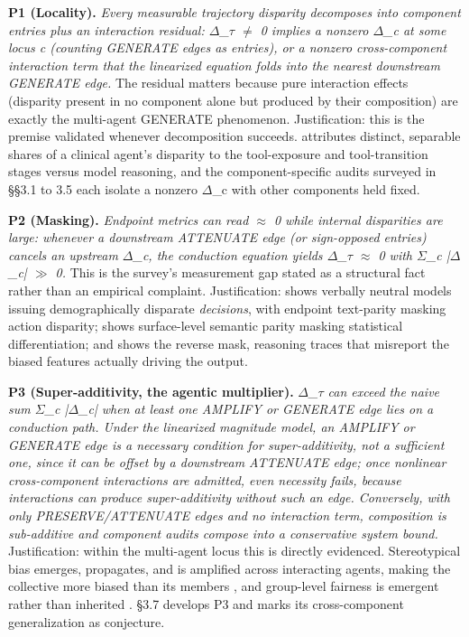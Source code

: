 \documentclass[10pt]{article}
\begin{document}
\textbf{P1 (Locality).} \emph{Every measurable trajectory disparity decomposes into component entries plus an interaction residual: $\Delta$\_$\tau$ $\neq$ 0 implies a nonzero $\Delta$\_c at some locus c (counting GENERATE edges as entries), or a nonzero cross-component interaction term that the linearized equation folds into the nearest downstream GENERATE edge.} The residual matters because pure interaction effects (disparity present in no component alone but produced by their composition) are exactly the multi-agent GENERATE phenomenon. Justification: this is the premise validated whenever decomposition succeeds. \cite{xu2026ducx} attributes distinct, separable shares of a clinical agent's disparity to the tool-exposure and tool-transition stages versus model reasoning, and the component-specific audits surveyed in \S{}\S{}3.1 to 3.5 each isolate a nonzero $\Delta$\_c with other components held fixed.

\textbf{P2 (Masking).} \emph{Endpoint metrics can read $\approx$ 0 while internal disparities are large: whenever a downstream ATTENUATE edge (or sign-opposed entries) cancels an upstream $\Delta$\_c, the conduction equation yields $\Delta$\_$\tau$ $\approx$ 0 with $\Sigma$\_c |$\Delta$\_c| $\gg$ 0.} This is the survey's measurement gap stated as a structural fact rather than an empirical complaint. Justification: \cite{li2025actions} shows verbally neutral models issuing demographically disparate \emph{decisions}, with endpoint text-parity masking action disparity; \cite{xu2025quantifying} shows surface-level semantic parity masking statistical differentiation; and \cite{turpin2023language} shows the reverse mask, reasoning traces that misreport the biased features actually driving the output.

\textbf{P3 (Super-additivity, the agentic multiplier).} \emph{$\Delta$\_$\tau$ can exceed the naive sum $\Sigma$\_c |$\Delta$\_c| when at least one AMPLIFY or GENERATE edge lies on a conduction path. Under the linearized magnitude model, an AMPLIFY or GENERATE edge is a necessary condition for super-additivity, not a sufficient one, since it can be offset by a downstream ATTENUATE edge; once nonlinear cross-component interactions are admitted, even necessity fails, because interactions can produce super-additivity without such an edge. Conversely, with only PRESERVE/ATTENUATE edges and no interaction term, composition is sub-additive and component audits compose into a conservative system bound.} Justification: within the multi-agent locus this is directly evidenced. Stereotypical bias emerges, propagates, and is amplified across interacting agents, making the collective more biased than its members \cite{nguyen2025social}, and group-level fairness is emergent rather than inherited \cite{madigan2025emergent}. \S{}3.7 develops P3 and marks its cross-component generalization as conjecture.
\end{document}
